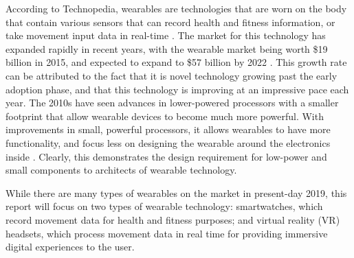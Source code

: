 According to Technopedia, wearables are technologies that are worn on
the body that contain various sensors that can record health and fitness
information, or take movement input data in real-time \cite{technopedia_defn}.
The market for this technology has expanded rapidly in recent years, with the
wearable market being worth \$19 billion in 2015, and expected to expand to \$57 billion
by 2022 \cite{market_growth}. This growth rate can be attributed to the fact that it is novel
technology growing past the early adoption phase, and that this technology is improving
at an impressive pace each year. The 2010s have seen advances in lower-powered processors with 
a smaller footprint that allow wearable devices to become much more powerful. With improvements in
small, powerful processors, it allows wearables to have more functionality, and focus less on
designing the wearable around the electronics inside \cite{wearable_rev}. Clearly, this demonstrates
the design requirement for low-power and small components to architects of wearable technology.

While there are many types of wearables on the market in present-day 2019, this report will
focus on two types of wearable technology: smartwatches, which record movement data
for health and fitness purposes; and virtual reality (VR) headsets, which process
movement data in real time for providing immersive digital experiences to the user.